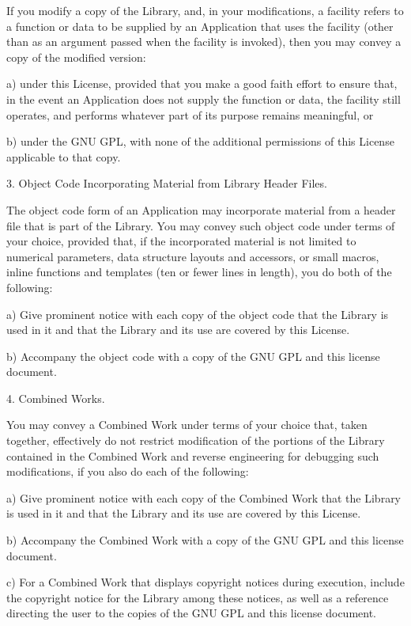 \begin{DoxyVerbInclude}
  If you modify a copy of the Library, and, in your modifications, a
facility refers to a function or data to be supplied by an Application
that uses the facility (other than as an argument passed when the
facility is invoked), then you may convey a copy of the modified
version:

   a) under this License, provided that you make a good faith effort to
   ensure that, in the event an Application does not supply the
   function or data, the facility still operates, and performs
   whatever part of its purpose remains meaningful, or

   b) under the GNU GPL, with none of the additional permissions of
   this License applicable to that copy.

  3. Object Code Incorporating Material from Library Header Files.

  The object code form of an Application may incorporate material from
a header file that is part of the Library.  You may convey such object
code under terms of your choice, provided that, if the incorporated
material is not limited to numerical parameters, data structure
layouts and accessors, or small macros, inline functions and templates
(ten or fewer lines in length), you do both of the following:

   a) Give prominent notice with each copy of the object code that the
   Library is used in it and that the Library and its use are
   covered by this License.

   b) Accompany the object code with a copy of the GNU GPL and this license
   document.

  4. Combined Works.

  You may convey a Combined Work under terms of your choice that,
taken together, effectively do not restrict modification of the
portions of the Library contained in the Combined Work and reverse
engineering for debugging such modifications, if you also do each of
the following:

   a) Give prominent notice with each copy of the Combined Work that
   the Library is used in it and that the Library and its use are
   covered by this License.

   b) Accompany the Combined Work with a copy of the GNU GPL and this license
   document.

   c) For a Combined Work that displays copyright notices during
   execution, include the copyright notice for the Library among
   these notices, as well as a reference directing the user to the
   copies of the GNU GPL and this license document.


\end{DoxyVerbInclude}
